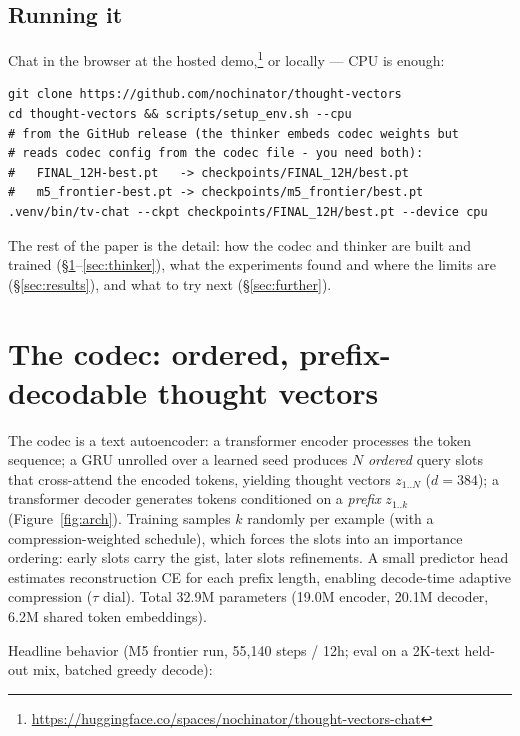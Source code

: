 \documentclass[11pt]{article}
\begin{document}
\subsection{Running it}
\label{sec:running}
Chat in the browser at the hosted
demo,\footnote{\url{https://huggingface.co/spaces/nochinator/thought-vectors-chat}}
or locally --- CPU is enough:

\begin{verbatim}
git clone https://github.com/nochinator/thought-vectors
cd thought-vectors && scripts/setup_env.sh --cpu
# from the GitHub release (the thinker embeds codec weights but
# reads codec config from the codec file - you need both):
#   FINAL_12H-best.pt   -> checkpoints/FINAL_12H/best.pt
#   m5_frontier-best.pt -> checkpoints/m5_frontier/best.pt
.venv/bin/tv-chat --ckpt checkpoints/FINAL_12H/best.pt --device cpu
\end{verbatim}

The rest of the paper is the detail: how the codec and thinker are built
and trained (\S\ref{sec:codec}--\ref{sec:thinker}), what the experiments
found and where the limits are (\S\ref{sec:results}), and what to try next
(\S\ref{sec:further}).



\section{The codec: ordered, prefix-decodable thought vectors}
\label{sec:codec}

The codec is a text autoencoder: a transformer encoder processes the token
sequence; a GRU unrolled over a learned seed produces $N$ \emph{ordered}
query slots that cross-attend the encoded tokens, yielding thought vectors
$z_{1..N}$ ($d{=}384$); a transformer decoder generates tokens conditioned on
a \emph{prefix} $z_{1..k}$ (Figure~\ref{fig:arch}). Training samples $k$ randomly per example
(with a compression-weighted schedule), which forces the slots into an
importance ordering: early slots carry the gist, later slots refinements. A
small predictor head estimates reconstruction CE for each prefix length,
enabling decode-time adaptive compression ($\tau$ dial). Total 32.9M
parameters (19.0M encoder, 20.1M decoder, 6.2M shared token embeddings).


Headline behavior (M5 frontier run, 55{,}140 steps / 12h; eval on a 2K-text
held-out mix, batched greedy decode):
\end{document}
